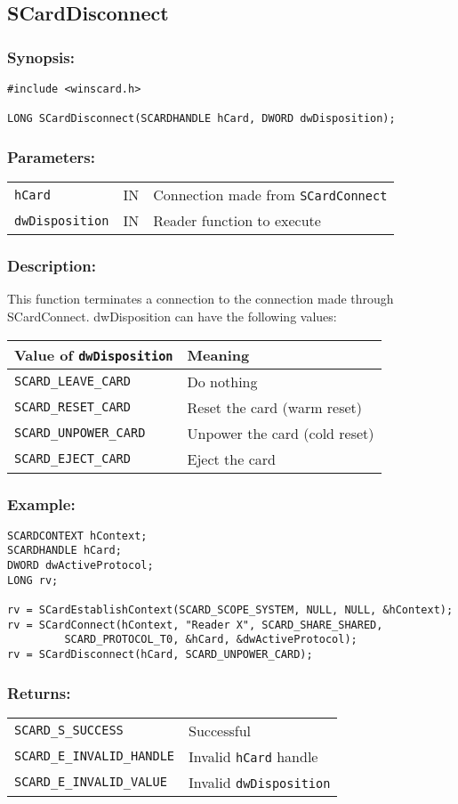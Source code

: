 \documentclass[a4paper,12pt]{article}
\newcommand{\synopsis}{\subsubsection{Synopsis:}}
\newcommand{\parameters}{\subsubsection{Parameters:}}
\newcommand{\desc}{\subsubsection{Description:}}
\newcommand{\example}{\subsubsection{Example:}}
\newcommand{\returns}{\subsubsection{Returns:}}
\begin{document}
\subsection{SCardDisconnect}

\synopsis

\begin{verbatim}
#include <winscard.h>

LONG SCardDisconnect(SCARDHANDLE hCard, DWORD dwDisposition);
\end{verbatim}

\parameters

\begin{tabular}{lll}
\texttt{hCard} & IN	& Connection made from \texttt{SCardConnect} \\
\texttt{dwDisposition} & IN & Reader function to execute \\
\end{tabular}

\desc

This function terminates a connection to the connection made through
SCardConnect.  dwDisposition can have the following values:

\begin{tabular}{|l|l|}
\hline
Value of \texttt{dwDisposition} & Meaning \\
\hline
\hline
\texttt{SCARD\_LEAVE\_CARD} & Do nothing\\
\texttt{SCARD\_RESET\_CARD} & Reset the card (warm reset) \\
\texttt{SCARD\_UNPOWER\_CARD} & Unpower the card (cold reset) \\
\texttt{SCARD\_EJECT\_CARD} & Eject the card\\
\hline
\end{tabular}

\example
\begin{verbatim}
SCARDCONTEXT hContext;
SCARDHANDLE hCard;
DWORD dwActiveProtocol;
LONG rv;

rv = SCardEstablishContext(SCARD_SCOPE_SYSTEM, NULL, NULL, &hContext);
rv = SCardConnect(hContext, "Reader X", SCARD_SHARE_SHARED,
         SCARD_PROTOCOL_T0, &hCard, &dwActiveProtocol);
rv = SCardDisconnect(hCard, SCARD_UNPOWER_CARD);
\end{verbatim}

\returns

\begin{tabular}{ll}
\texttt{SCARD\_S\_SUCCESS}			& Successful \\
\texttt{SCARD\_E\_INVALID\_HANDLE}		& Invalid \texttt{hCard} handle \\
\texttt{SCARD\_E\_INVALID\_VALUE}		& Invalid \texttt{dwDisposition} \\
\end{tabular}
\end{document}
